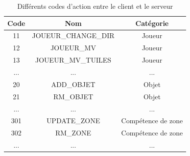 \documentclass[11pt]{article}
\begin{document}
            \begin{table}[h]
                \centering
                \begin{tabular}{|c|c|c|}
                    \hline
                    Code & Nom & Catégorie \\
                    \hline
                    11 & JOUEUR\_CHANGE\_DIR & Joueur \\
                    12 & JOUEUR\_MV & Joueur \\
                    13 & JOUEUR\_MV\_TUILES & Joueur \\
                    ... & ... & ... \\
                    20 & ADD\_OBJET & Objet \\
                    21 & RM\_OBJET & Objet \\
                    ... & ... & ... \\
                    301 & UPDATE\_ZONE & Compétence de zone \\
                    302 & RM\_ZONE & Compétence de zone \\
                    ... & ... & ... \\
                    \hline
                \end{tabular}
                \caption{Différents codes d'action entre le client et le serveur}
                \label{tab:tabCliServ}
            \end{table}
\end{document}
